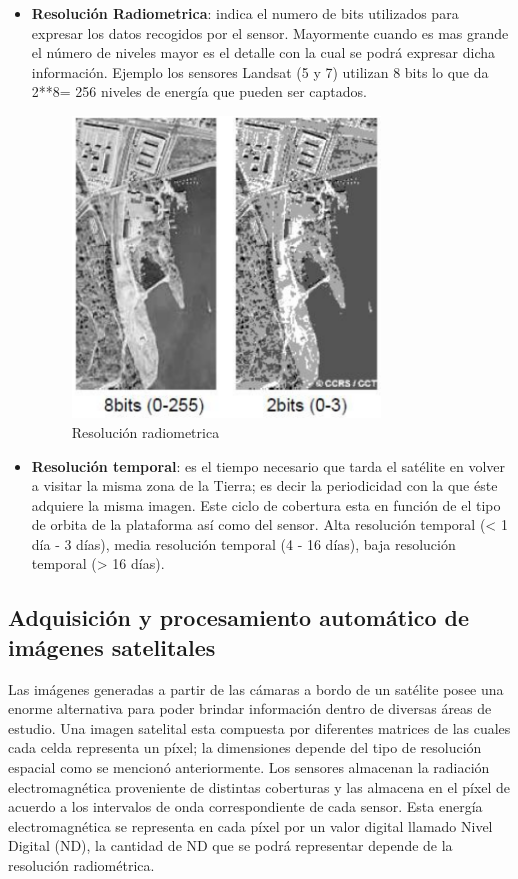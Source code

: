 \begin{itemize}
\item \textbf{Resolución Radiometrica}: indica el numero de bits utilizados para expresar los datos recogidos por el sensor. Mayormente cuando es mas grande el número de niveles mayor es el detalle con la cual se podrá expresar dicha información. Ejemplo los sensores Landsat (5 y 7) utilizan 8 bits lo que da 2**8= 256 niveles de energía que pueden ser captados.
\begin{figure}[H] \centering
  \includegraphics[height=8cm,keepaspectratio=true,clip=true]{imagenes/MarcoTeorico/resolucion_radiometrica.png}
  \caption{Resolución radiometrica}\label{Fig:resolucion-radiometrica}
\end{figure}

\item \textbf{Resolución temporal}: es el tiempo necesario que tarda el satélite en volver a visitar la misma zona de la Tierra; es decir la periodicidad con la que éste adquiere la misma imagen. Este ciclo de cobertura esta en función de el tipo de orbita de la plataforma así como del sensor. Alta resolución temporal (< 1 día - 3 días), media resolución temporal (4 - 16 días), baja resolución temporal (> 16 días).

\end{itemize}

\subsection{Adquisición y procesamiento automático de imágenes satelitales}\label{sub:imagen_satelital}

Las imágenes generadas a partir de las cámaras a bordo de un satélite posee una enorme alternativa para poder brindar información dentro de diversas áreas de estudio. Una imagen satelital esta compuesta por diferentes matrices de las cuales cada celda representa un píxel; la dimensiones  depende del tipo de resolución espacial como se mencionó anteriormente. Los sensores almacenan la radiación electromagnética proveniente de distintas coberturas y las almacena en el píxel de acuerdo a los intervalos de onda correspondiente de cada sensor. Esta energía electromagnética se representa en cada píxel por un valor digital llamado Nivel Digital (ND), la cantidad de ND que se podrá representar depende de la resolución radiométrica.

